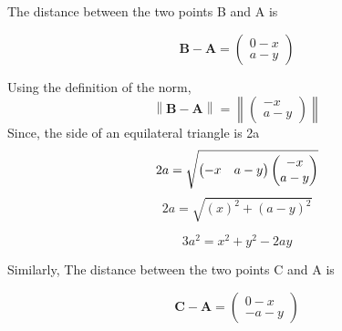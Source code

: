 \documentclass[journal,12pt,twocolumn]{IEEEtran}
\providecommand{\norm}[1]{\left\lVert#1\right\rVert}
\let\vec\mathbf
\newcommand{\myvec}[1]{\ensuremath{\begin{pmatrix}#1\end{pmatrix}}}
\begin{document}

\noindent The distance between the two points B and A is

\begin{equation}	
\vec{B}-\vec{A} = \myvec{0-x \\ a-y}
\end{equation}

\noindent Using the definition   of the norm, 
		\begin{equation}
\norm{\vec{B}-\vec{A}} =\norm{\myvec{-x \\ a-y}}
\end{equation}
\noindent Since, the side of an equilateral triangle is 2a	
\begin{equation}						
			2a=\sqrt{\myvec{-x & a-y}\myvec{-x \\ a-y}} 
\\
\end{equation}
\begin{equation}						
2a =  \sqrt{(x)^2+ (a-y)^2}
\end{equation}
%

\begin{equation}
3a^2 = {x^2+y^2-2ay}
\label{eq-1-}
\end{equation}

\noindent Similarly, The distance between the two points C and A is

\begin{equation}	
\vec{C}-\vec{A} = \myvec{0-x \\ -a-y}
\end{equation}
\end{document}
